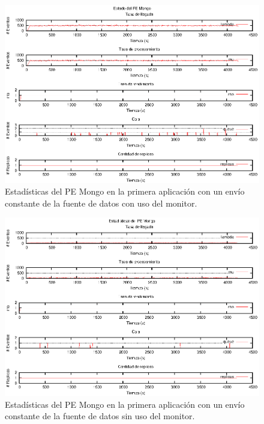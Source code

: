 \begin{figure}[p]
\centering
    \includegraphics[scale=1.1]{images/exp/app1/uniform/cm/statusMongoPE.eps}
    \caption{Estadísticas del PE Mongo en la primera aplicación con un envío constante de la fuente de datos con uso del monitor.}
    \label{fig:app1-uniform-statusMongoPE-cm}
\end{figure}

\begin{figure}[p]
\centering
    \includegraphics[scale=1.1]{images/exp/app1/uniform/sm/statusMongoPE.eps}
    \caption{Estadísticas del PE Mongo en la primera aplicación con un envío constante de la fuente de datos sin uso del monitor.}
    \label{fig:app1-uniform-statusMongoPE-sm}
\end{figure}

